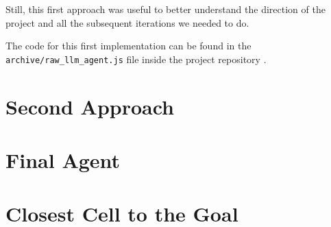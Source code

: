 Still, this first approach was useful to better understand the direction of the project
and all the subsequent iterations we needed to do.

The code for this first implementation can be found in the \texttt{archive/raw\_llm\_agent.js}
file inside the project repository \cite{projectrepo}.

\section{Second Approach}
\label{sec:second_approach}

\section{Final Agent}
\label{sec:final_agent}

\section{Closest Cell to the Goal}
\label{sec:closest_cell_to_the_goal}